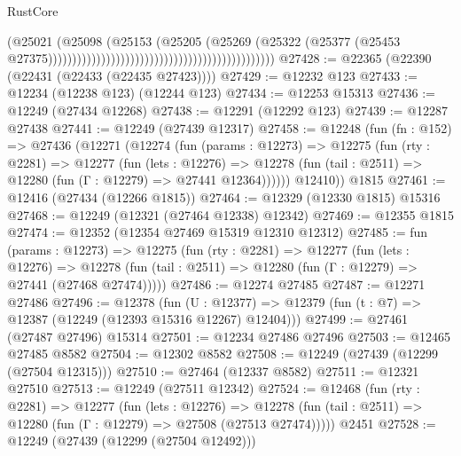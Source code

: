 \begin{lexlean}{RustCore}
\begin{coremodule}
                                                                                  (@25021
                                                                                    (@25098
                                                                                      (@25153
                                                                                        (@25205
                                                                                          (@25269
                                                                                            (@25322
                                                                                              (@25377
                                                                                                (@25453
                                                                                                  @27375)))))))))))))))))))))))))))))))))))))))))))))))
@27428 := @22365 (@22390 (@22431 (@22433 (@22435 @27423))))
@27429 := @12232 @123
@27433 := @12234 (@12238 @123) (@12244 @123)
@27434 := @12253 @15313
@27436 := @12249 (@27434 @12268)
@27438 := @12291 (@12292 @123)
@27439 := @12287 @27438
@27441 := @12249 (@27439 @12317)
@27458 := @12248
    (fun (fn : @152) =>
    @27436
      (@12271
        (@12274
          (fun (params : @12273) =>
          @12275
            (fun (rty : @2281) =>
            @12277
              (fun (lets : @12276) =>
              @12278 (fun (tail : @2511) => @12280 (fun (Γ : @12279) => @27441 @12364))))))
        @12410))
    @1815
@27461 := @12416 (@27434 (@12266 @1815))
@27464 := @12329 (@12330 @1815) @15316
@27468 := @12249 (@12321 (@27464 @12338) @12342)
@27469 := @12355 @1815
@27474 := @12352 (@12354 @27469 @15319 @12310 @12312)
@27485 := fun (params : @12273) =>
  @12275
    (fun (rty : @2281) =>
    @12277
      (fun (lets : @12276) =>
      @12278 (fun (tail : @2511) => @12280 (fun (Γ : @12279) => @27441 (@27468 @27474)))))
@27486 := @12274 @27485
@27487 := @12271 @27486
@27496 := @12378
    (fun (U : @12377) => @12379 (fun (t : @7) => @12387 (@12249 (@12393 @15316 @12267) @12404)))
@27499 := @27461 (@27487 @27496) @15314
@27501 := @12234 @27486 @27496
@27503 := @12465 @27485 @8582
@27504 := @12302 @8582
@27508 := @12249 (@27439 (@12299 (@27504 @12315)))
@27510 := @27464 (@12337 @8582)
@27511 := @12321 @27510
@27513 := @12249 (@27511 @12342)
@27524 := @12468
    (fun (rty : @2281) =>
    @12277
      (fun (lets : @12276) =>
      @12278 (fun (tail : @2511) => @12280 (fun (Γ : @12279) => @27508 (@27513 @27474)))))
    @2451
@27528 := @12249 (@27439 (@12299 (@27504 @12492)))

\end{coremodule}
\end{lexlean}
